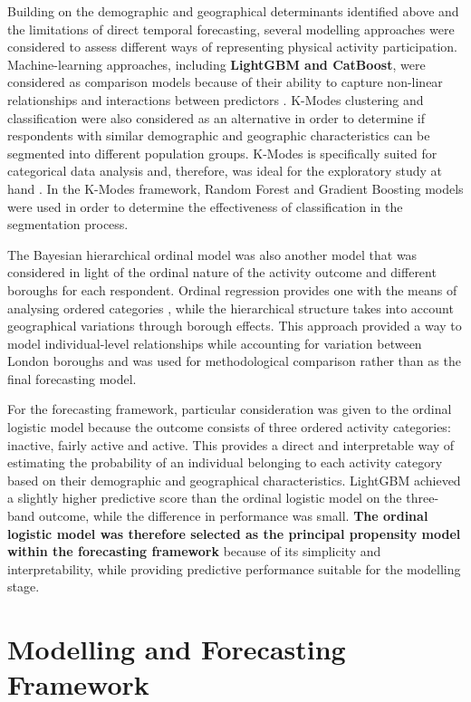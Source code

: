 \documentclass[ %
                    author={Ashrey Ashrey, Sanya Kapoor, Trisha Sharma, Yash Bhooshan Pandloskar},
                supervisor={Dr. Dalila O’Grady},
                    degree={MSc},
                     title={Using machine learning to forecast physical activity participation, volunteering and activity patterns in London},
                  subtitle={},
                      type={},
                      year={2021}]{dissertation}
\begin{document}
Building on the demographic and geographical determinants identified above and the limitations of direct temporal forecasting, several modelling approaches were considered to assess different ways of representing physical activity participation. Machine-learning approaches, including \textbf{LightGBM and CatBoost}, were considered as comparison models because of their ability to capture non-linear relationships and interactions between predictors \cite{ke_etal_2017,prokhorenkova_etal_2018}. K-Modes clustering and classification were also considered as an alternative in order to determine if respondents with similar demographic and geographic characteristics can be segmented into different population groups. K-Modes is specifically suited for categorical data analysis and, therefore, was ideal for the exploratory study at hand \cite{huang_1997}. In the K-Modes framework, Random Forest and Gradient Boosting models were used in order to determine the effectiveness of classification in the segmentation process.

The Bayesian hierarchical ordinal model was also another model that was considered in light of the ordinal nature of the activity outcome and different boroughs for each respondent. Ordinal regression provides one with the means of analysing ordered categories \cite{mccullagh_1980}, while the hierarchical structure takes into account geographical variations through borough effects. This approach provided a way to model individual-level relationships while accounting for variation between London boroughs and was used for methodological comparison rather than as the final forecasting model.

For the forecasting framework, particular consideration was given to the ordinal logistic model because the outcome consists of three ordered activity categories: inactive, fairly active and active. This provides a direct and interpretable way of estimating the probability of an individual belonging to each activity category based on their demographic and geographical characteristics. LightGBM achieved a slightly higher predictive score than the ordinal logistic model on the three-band outcome, while the difference in performance was small. \textbf{The ordinal logistic model was therefore selected as the principal propensity model within the forecasting framework} because of its simplicity and interpretability, while providing predictive performance suitable for the modelling stage.

\section{Modelling and Forecasting Framework}
\end{document}
